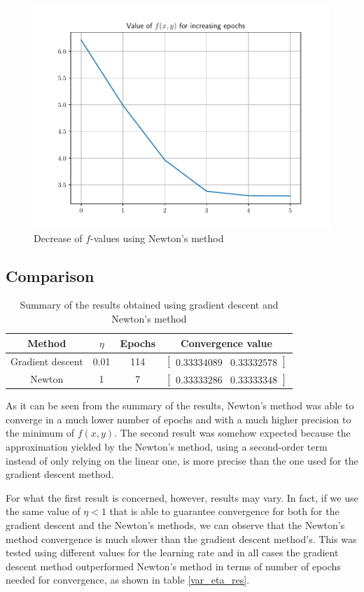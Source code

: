 \documentclass[letterpaper,headings=standardclasses]{scrartcl}
\begin{document}
\begin{figure}[H]
\centering
\includegraphics[width=.6\linewidth]{nm_fval.pdf}
\caption{Decrease of $f$-values using Newton's method}
\label{nm_fval}
\end{figure}

\subsection{Comparison}

\begin{table}[h]
\centering
\begin{tabular}{|c|c|c|c|}
\hline
Method           & $\eta$ & Epochs & Convergence value \\ \hline
Gradient descent & 0.01   & 114    & $[\begin{matrix} 0.33334089 & 0.33332578 \end{matrix}]$ \\ \hline
Newton           & 1      & 7      & $[\begin{matrix} 0.33333286 & 0.33333348 \end{matrix}]$ \\ \hline
\end{tabular}
\caption{Summary of the results obtained using gradient descent and Newton's method}
\label{summ_res}
\end{table}

As it can be seen from the summary of the results, Newton's method was able to converge in a much lower number of epochs and with a much higher precision to the minimum of $f(x,y)$. The second result was somehow expected because the approximation yielded by the Newton's method, using a second-order term instead of only relying on the linear one, is more precise than the one used for the gradient descent method.

For what the first result is concerned, however, results may vary. In fact, if we use the same value of $\eta < 1$ that is able to guarantee convergence for both for the gradient descent and the Newton's methods, we can observe that the Newton's method convergence is much slower than the gradient descent method's. This was tested using different values for the learning rate and in all cases the gradient descent method outperformed Newton's method in terms of number of epochs needed for convergence, as shown in table \ref{var_eta_res}.
\end{document}
